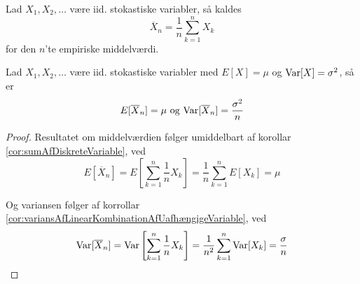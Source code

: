 \begin{defn}
  Lad $X_{1}, X_{2}, \ldots$ være iid. stokastiske variabler, så kaldes
  \[
    \overline{X}_{n} = \frac{1}{n} \sum_{k=1}^n X_{k}
  \]
  for den $n$'te empiriske middelværdi.
\end{defn}

\begin{lem} \label{lem:variansOgForventedeVærdiAfEmpiriskMiddelværdi}
  Lad $X_{1}, X_{2}, \ldots$ være iid. stokastiske variabler med $E[X] = \mu$ og $\textnormal{Var}[X] = \sigma^{2}$, så er
  \begin{equation*}
    E[\overline{X}_{n}] = \mu \text{ og } \textnormal{Var}[\overline{X}_{n}] = \frac{\sigma^{2}}{n}
  \end{equation*}
\end{lem}
\begin{proof}
  Resultatet om middelværdien følger umiddelbart af korollar \ref{cor:sumAfDiskreteVariable}, ved
  \begin{equation*}
    E[\overline{X}_{n}] = E \left[\sum^{n}_{k = 1} \frac{1}{n} X_{k}\right] = \frac{1}{n} \sum_{k=1}^{n} E[X_{k}] = \mu
  \end{equation*}

  Og variansen følger af korrollar \ref{cor:variansAfLinearKombinationAfUafhængigeVariable}, ved
  \begin{equation*}
    \textnormal{Var}[\overline{X}_{n}] = \textnormal{Var} \left[\sum^{n}_{k = 1} \frac{1}{n} X_{k}\right] = \frac{1}{n^{2}} \sum_{k=1}^{n} \textnormal{Var}[X_{k}] = \frac{\sigma}{n}
  \end{equation*}
\end{proof}

